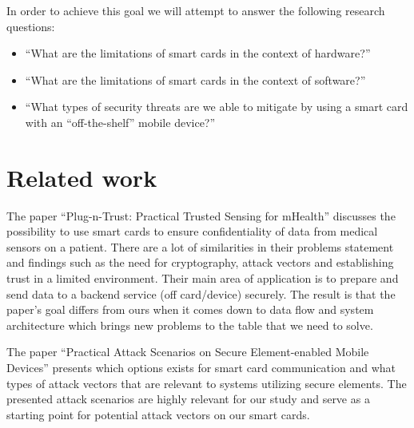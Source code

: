 In order to achieve this goal we will attempt to answer the following research questions:
\begin{itemize}
  \item ``What are the limitations of smart cards in the context of hardware?''
  \item ``What are the limitations of smart cards in the context of software?''
  \item ``What types of security threats are we able to mitigate by using a smart card with an ``off-the-shelf'' mobile device?''
\end{itemize}



\section{Related work}
The paper ``Plug-n-Trust: Practical Trusted Sensing for mHealth'' \cite{plugntrust} discusses the possibility to use smart cards to ensure confidentiality of data from medical sensors on a patient. There are a lot of similarities in their problems statement and findings such as the need for cryptography, attack vectors and establishing trust in a limited environment. Their main area of application is to prepare and send data to a backend service (off card/device) securely. The result is that the paper's goal differs from ours when it comes down to data flow and system architecture which brings new problems to the table that we need to solve.

The paper ``Practical Attack Scenarios on Secure Element-enabled Mobile Devices'' \cite{practicalAttacksSE} presents which options exists for smart card communication and what types of attack vectors that are relevant to systems utilizing secure elements. The presented attack scenarios are highly relevant for our study and serve as a starting point for potential attack vectors on our smart cards.

